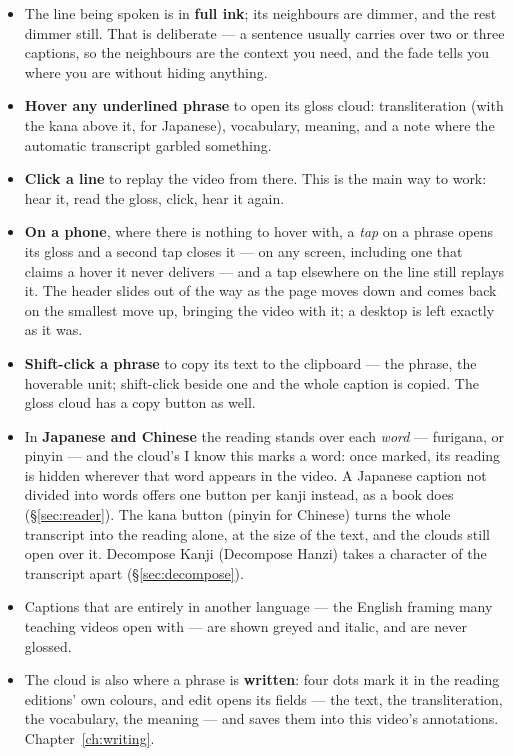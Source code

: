 \documentclass[11pt,oneside]{report}
\newcommand{\menu}[1]{\textsf{#1}}
\begin{document}
\begin{itemize}
\item The line being spoken is in \textbf{full ink}; its neighbours are
  dimmer, and the rest dimmer still. That is deliberate --- a sentence
  usually carries over two or three captions, so the neighbours are the
  context you need, and the fade tells you where you are without hiding
  anything.
\item \textbf{Hover any underlined phrase} to open its gloss cloud:
  transliteration (with the kana above it, for Japanese), vocabulary,
  meaning, and a note where the automatic transcript garbled something.
\item \textbf{Click a line} to replay the video from there. This is the main
  way to work: hear it, read the gloss, click, hear it again.
\item \textbf{On a phone}, where there is nothing to hover with, a
  \emph{tap} on a phrase opens its gloss and a second tap closes it --- on
  any screen, including one that claims a hover it never delivers --- and a
  tap elsewhere on the line still replays it. The header slides out of the
  way as the page moves down and comes back on the smallest move up, bringing
  the video with it; a desktop is left exactly as it was.
\item \textbf{Shift-click a phrase} to copy its text to the clipboard ---
  the phrase, the hoverable unit; shift-click beside one and the whole
  caption is copied. The gloss cloud has a \menu{copy} button as well.
\item In \textbf{Japanese and Chinese} the reading stands over each
  \emph{word} --- furigana, or pinyin --- and the cloud's \menu{I know this}
  marks a word: once marked, its reading is hidden wherever that word appears
  in the video. A Japanese caption not divided into words offers one button
  per kanji instead, as a book does (\S\ref{sec:reader}). The \menu{kana}
  button (\menu{pinyin} for Chinese) turns the
  whole transcript into the reading alone, at the size of the text, and the
  clouds still open over it. \menu{Decompose Kanji} (\menu{Decompose
  Hanzi}) takes a character of the transcript apart (\S\ref{sec:decompose}).
\item Captions that are entirely in another language --- the English framing
  many teaching videos open with --- are shown greyed and italic, and are
  never glossed.
\item The cloud is also where a phrase is \textbf{written}: four dots mark it
  in the reading editions' own colours, and \menu{edit} opens its fields ---
  the text, the transliteration, the vocabulary, the meaning --- and saves
  them into this video's annotations. Chapter~\ref{ch:writing}.
\end{itemize}
\end{document}
